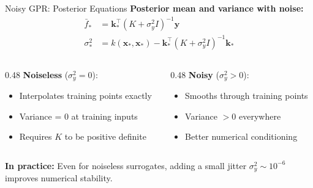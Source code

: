 \documentclass[aspectratio=169,11pt]{beamer}
\newcommand{\x}{\bm{x}}
\begin{document}
\begin{frame}{Noisy GPR: Posterior Equations}
\textbf{Posterior mean and variance with noise:}
\begin{align}
\bar{f}_* &= \bm{k}_*^\top (K + \sigma_y^2 I)^{-1} \bm{y} \\
\sigma_*^2 &= k(\x_*, \x_*) - \bm{k}_*^\top (K + \sigma_y^2 I)^{-1} \bm{k}_*
\end{align}

\vspace{0.3cm}
\begin{columns}[T]
\begin{column}{0.48\textwidth}
\textbf{Noiseless} ($\sigma_y^2 = 0$):
\begin{itemize}
  \item Interpolates training points exactly
  \item Variance = 0 at training inputs
  \item Requires $K$ to be positive definite
\end{itemize}
\end{column}
\begin{column}{0.48\textwidth}
\textbf{Noisy} ($\sigma_y^2 > 0$):
\begin{itemize}
  \item Smooths through training points
  \item Variance $> 0$ everywhere
  \item Better numerical conditioning
\end{itemize}
\end{column}
\end{columns}

\vspace{0.3cm}
{\small \textbf{In practice:} Even for noiseless surrogates, adding a small jitter $\sigma_y^2 \sim 10^{-6}$ improves numerical stability.}
\end{frame}
\end{document}
